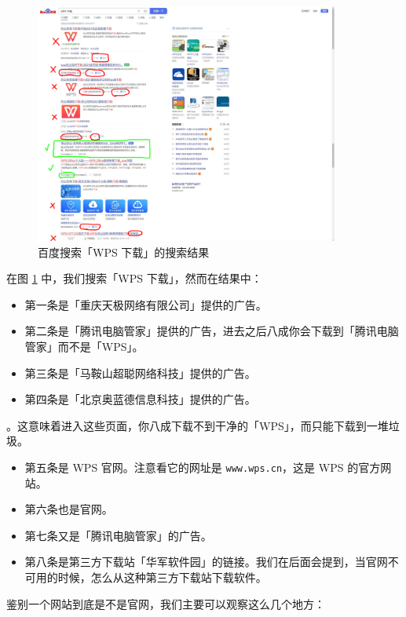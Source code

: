 \begin{figure}[htb!]
  \centering
  \includegraphics[width=10cm]{assets/Baidu_result.png}
  \caption{百度搜索「WPS 下载」的搜索结果}
  \label{baidu-wps-result}
\end{figure}

在图 \ref{baidu-wps-result} 中，我们搜索「WPS 下载」，然而在结果中：

\begin{itemize}
  \item 第一条是「重庆天极网络有限公司」提供的广告。
  \item 第二条是「腾讯电脑管家」提供的广告，进去之后八成你会下载到「腾讯电脑管家」而不是「WPS」。
  \item 第三条是「马鞍山超聪网络科技」提供的广告。
  \item 第四条是「北京奥蓝德信息科技」提供的广告。
\end{itemize}

。这意味着进入这些页面，你八成下载不到干净的「WPS」，而只能下载到一堆垃圾。

\begin{itemize}
  \item 第五条是 WPS 官网。注意看它的网址是 \verb|www.wps.cn|，这是 WPS 的官方网站。
  \item 第六条也是官网。
  \item 第七条又是「腾讯电脑管家」的广告。
  \item 第八条是第三方下载站「华军软件园」的链接。我们在后面会提到，当官网不可用的时候，怎么从这种第三方下载站下载软件。
\end{itemize}

鉴别一个网站到底是不是官网，我们主要可以观察这么几个地方：

